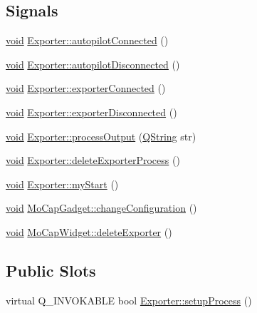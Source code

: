 \subsection*{Signals}
\begin{DoxyCompactItemize}
\item 
\hyperlink{group___u_a_v_objects_plugin_ga444cf2ff3f0ecbe028adce838d373f5c}{void} \hyperlink{group___mo_cap_plugin_ga52a7d20152fb6923f10c6940a7286396}{Exporter\-::autopilot\-Connected} ()
\item 
\hyperlink{group___u_a_v_objects_plugin_ga444cf2ff3f0ecbe028adce838d373f5c}{void} \hyperlink{group___mo_cap_plugin_ga94d2323c5abe7b5fb873f894f1115462}{Exporter\-::autopilot\-Disconnected} ()
\item 
\hyperlink{group___u_a_v_objects_plugin_ga444cf2ff3f0ecbe028adce838d373f5c}{void} \hyperlink{group___mo_cap_plugin_gab2bac0f39a4f396ad4d99829d85ca4d9}{Exporter\-::exporter\-Connected} ()
\item 
\hyperlink{group___u_a_v_objects_plugin_ga444cf2ff3f0ecbe028adce838d373f5c}{void} \hyperlink{group___mo_cap_plugin_gae4dad27cecdf9ed206a7ebb5b711a23d}{Exporter\-::exporter\-Disconnected} ()
\item 
\hyperlink{group___u_a_v_objects_plugin_ga444cf2ff3f0ecbe028adce838d373f5c}{void} \hyperlink{group___mo_cap_plugin_gafcdca00f55b093906997cc158f7fa39c}{Exporter\-::process\-Output} (\hyperlink{group___u_a_v_objects_plugin_gab9d252f49c333c94a72f97ce3105a32d}{Q\-String} str)
\item 
\hyperlink{group___u_a_v_objects_plugin_ga444cf2ff3f0ecbe028adce838d373f5c}{void} \hyperlink{group___mo_cap_plugin_gaced02c5dc9cdfc8e07c7be1b3ea03d4f}{Exporter\-::delete\-Exporter\-Process} ()
\item 
\hyperlink{group___u_a_v_objects_plugin_ga444cf2ff3f0ecbe028adce838d373f5c}{void} \hyperlink{group___mo_cap_plugin_ga8588f1bba3155708a434f543372d7f7d}{Exporter\-::my\-Start} ()
\item 
\hyperlink{group___u_a_v_objects_plugin_ga444cf2ff3f0ecbe028adce838d373f5c}{void} \hyperlink{group___mo_cap_plugin_gacbc122d8949ff735984095e5d5bcce1b}{Mo\-Cap\-Gadget\-::change\-Configuration} ()
\item 
\hyperlink{group___u_a_v_objects_plugin_ga444cf2ff3f0ecbe028adce838d373f5c}{void} \hyperlink{group___mo_cap_plugin_ga34afe7fdc30edaad2ec82fdb72275fa8}{Mo\-Cap\-Widget\-::delete\-Exporter} ()
\end{DoxyCompactItemize}
\subsection*{Public Slots}
\begin{DoxyCompactItemize}
\item 
virtual Q\-\_\-\-I\-N\-V\-O\-K\-A\-B\-L\-E bool \hyperlink{group___mo_cap_plugin_gad43c05ef37398dad0c09a5103beb27d8}{Exporter\-::setup\-Process} ()
\end{DoxyCompactItemize}


